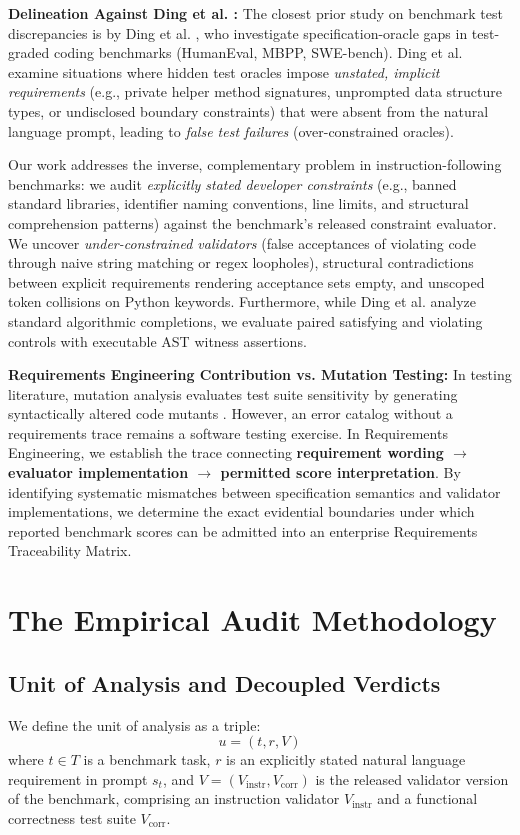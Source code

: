 \documentclass[runningheads]{llncs}
\begin{document}
\textbf{Delineation Against Ding et al. \cite{ding_spec_oracle_gaps_2026}:} The closest prior study on benchmark test discrepancies is by Ding et al. \cite{ding_spec_oracle_gaps_2026}, who investigate specification-oracle gaps in test-graded coding benchmarks (HumanEval, MBPP, SWE-bench). Ding et al. examine situations where hidden test oracles impose \emph{unstated, implicit requirements} (e.g., private helper method signatures, unprompted data structure types, or undisclosed boundary constraints) that were absent from the natural language prompt, leading to \emph{false test failures} (over-constrained oracles). 

Our work addresses the inverse, complementary problem in instruction-following benchmarks: we audit \emph{explicitly stated developer constraints} (e.g., banned standard libraries, identifier naming conventions, line limits, and structural comprehension patterns) against the benchmark's released constraint evaluator. We uncover \emph{under-constrained validators} (false acceptances of violating code through naive string matching or regex loopholes), structural contradictions between explicit requirements rendering acceptance sets empty, and unscoped token collisions on Python keywords. Furthermore, while Ding et al. analyze standard algorithmic completions, we evaluate paired satisfying and violating controls with executable AST witness assertions.

\textbf{Requirements Engineering Contribution vs. Mutation Testing:} In testing literature, mutation analysis evaluates test suite sensitivity by generating syntactically altered code mutants \cite{kiele_test_aware_mutants_2026}. However, an error catalog without a requirements trace remains a software testing exercise. In Requirements Engineering, we establish the trace connecting \textbf{requirement wording $\to$ evaluator implementation $\to$ permitted score interpretation}. By identifying systematic mismatches between specification semantics and validator implementations, we determine the exact evidential boundaries under which reported benchmark scores can be admitted into an enterprise Requirements Traceability Matrix.

\section{The Empirical Audit Methodology}
\label{sec:methodology}

\subsection{Unit of Analysis and Decoupled Verdicts}
We define the unit of analysis as a triple:
\begin{equation}
\label{eq:unit_of_analysis}
u = (t, r, V)
\end{equation}
where $t \in T$ is a benchmark task, $r$ is an explicitly stated natural language requirement in prompt $s_t$, and $V = (V_{\text{instr}}, V_{\text{corr}})$ is the released validator version of the benchmark, comprising an instruction validator $V_{\text{instr}}$ and a functional correctness test suite $V_{\text{corr}}$.
\end{document}
